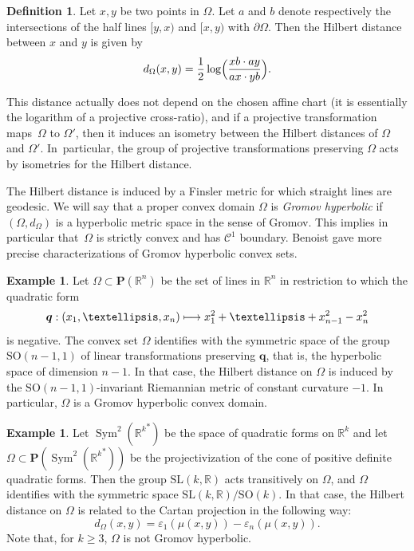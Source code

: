 \documentclass[11pt]{article}
\numberwithin{equation}{section}
\newcommand\mto{\mathchoice{\longmapsto}{\mapsto}{\mapsto}{\mapsto}}
\theoremstyle{definition}
\newtheorem{defi}[theo]{Definition}
\newtheorem{example}[theo]{Example}
\newcommand{\proj}{\mathbf{P}}
\newcommand{\R}{\mathbb{R}}
\newcommand{\SL}{\mathrm{SL}}
\newcommand{\SO}{\mathrm{SO}}
\DeclareMathOperator{\Sym}{Sym}
\let\epsilon\varepsilon
\begin{document}
\begin{defi}
Let $x,y$ be two points in $\Omega$. Let $a$ and $b$ denote respectively the intersections of the half lines $[y,x)$ and $[x,y)$ with $\partial \Omega$. Then the Hilbert distance between $x$ and $y$ is given by
\[d_\Omega(x,y) = \frac{1}{2}\log\Bigl(\frac{xb\cdot ay}{ax \cdot yb}\Bigr).\]
\end{defi}

This distance actually does not depend on the chosen affine chart (it is essentially the logarithm of a projective cross-ratio), and if a projective transformation maps~$\Omega$ to $\Omega'$, then it induces an isometry between the Hilbert distances of $\Omega$ and $\Omega'$. In~particular, the group of projective transformations preserving $\Omega$ acts by isometries for the Hilbert distance.

The Hilbert distance is induced by a Finsler metric for which straight lines are geodesic. We will say that a proper convex domain $\Omega$ is \emph{Gromov hyperbolic} if $(\Omega,d_\Omega)$ is a hyperbolic metric space in the sense of Gromov. This implies in particular that~$\Omega$ is strictly convex and has $\mathcal C^1$ boundary. Benoist \cite{Benoist2001convexe} gave more precise characterizations of Gromov hyperbolic convex sets.

\begin{example} \label{ex:Ellipsoid}
Let $\Omega \subset \proj(\R^n)$ be the set of lines in $\R^n$ in restriction to which the quadratic form
\[\boldsymbol{q} :(x_1,\ldots,x_n) \mto x_1^2+ \ldots + x_{n-1}^2 - x_n^2\]
is negative. The convex set $\Omega$ identifies with the symmetric space of the group \hbox{$\SO(n-1,1)$} of linear transformations preserving $\boldsymbol{q}$, that is, the hyperbolic space of dimension $n-1$. In that case, the Hilbert distance on $\Omega$ is induced by the $\SO(n-1,1)$-invariant Riemannian metric of constant curvature $-1$. In particular, $\Omega$ is a Gromov hyperbolic convex domain.
\end{example}

\begin{example} \label{ex:ConvexSymmetricSpace}
Let $\Sym^2({\R^k}^*)$ be the space of quadratic forms on $\R^k$ and let $\Omega \subset \proj(\Sym^2({\R^k}^*))$ be the projectivization of the cone of positive definite quadratic forms. Then the group $\SL(k,\R)$ acts transitively on $\Omega$, and $\Omega$ identifies with the symmetric space $\SL(k,\R)/\SO(k)$. In that case, the Hilbert distance on $\Omega$ is related to the Cartan projection in the following way:
\[d_\Omega(x,y) = \epsilon_1(\mu(x,y)) - \epsilon_n(\mu(x,y)).\]
Note that, for $k\geq 3$, $\Omega$ is not Gromov hyperbolic.
\end{example}
\end{document}
